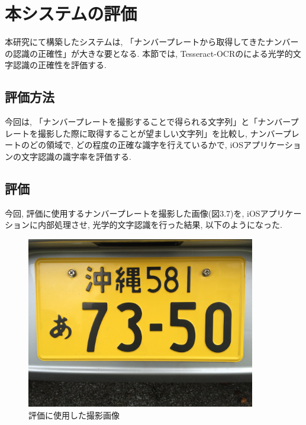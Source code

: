 \section{本システムの評価}
本研究にて構築したシステムは, 「ナンバープレートから取得してきたナンバーの認識の正確性」が大きな要となる.
本節では, Tesseract-OCRのによる光学的文字認識の正確性を評価する.

\subsection{評価方法}
今回は, 「ナンバープレートを撮影することで得られる文字列」と「ナンバープレートを撮影した際に取得することが望ましい文字列」を比較し, ナンバープレートのどの領域で, どの程度の正確な識字を行えているかで, iOSアプリケーションの文字認識の識字率を評価する.

\subsection{評価}
今回, 評価に使用するナンバープレートを撮影した画像(図3.7)を, iOSアプリケーションに内部処理させ, 光学的文字認識を行った結果, 以下のようになった. 

\begin{figure}
\begin{center}
\includegraphics[width=10cm]{fig/IMG_3104.JPG}
\end{center}
\caption{評価に使用した撮影画像}
\end{figure}

